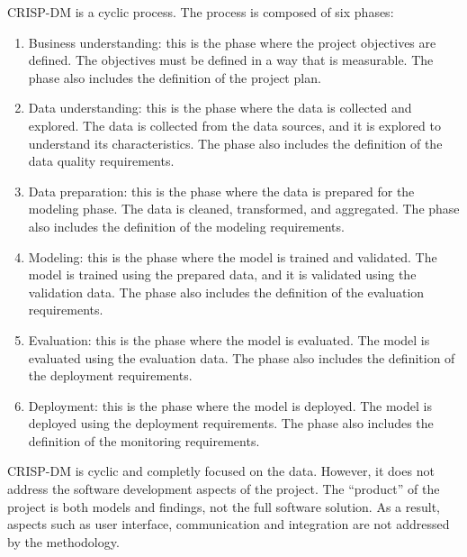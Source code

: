 CRISP-DM is a cyclic process.  The process is composed of six phases:
\begin{enumerate}
  \item Business understanding: this is the phase where the project objectives are
    defined.  The objectives must be defined in a way that is measurable.  The phase also
    includes the definition of the project plan.
  \item Data understanding: this is the phase where the data is collected and explored.
    The data is collected from the data sources, and it is explored to understand its
    characteristics.  The phase also includes the definition of the data quality
    requirements.
  \item Data preparation: this is the phase where the data is prepared for the modeling
    phase.  The data is cleaned, transformed, and aggregated.  The phase also includes the
    definition of the modeling requirements.
  \item Modeling: this is the phase where the model is trained and validated.  The model is
    trained using the prepared data, and it is validated using the validation data.  The
    phase also includes the definition of the evaluation requirements.
  \item Evaluation: this is the phase where the model is evaluated.  The model is evaluated
    using the evaluation data.  The phase also includes the definition of the deployment
    requirements.
  \item Deployment: this is the phase where the model is deployed.  The model is deployed
    using the deployment requirements.  The phase also includes the definition of the
    monitoring requirements.
\end{enumerate}

CRISP-DM is cyclic and completly focused on the data.  However, it does not address the
software development aspects of the project.  The ``product'' of the project is both
models and findings, not the full software solution.  As a result, aspects such as user
interface, communication and integration are not addressed by the methodology.

\clearpage

